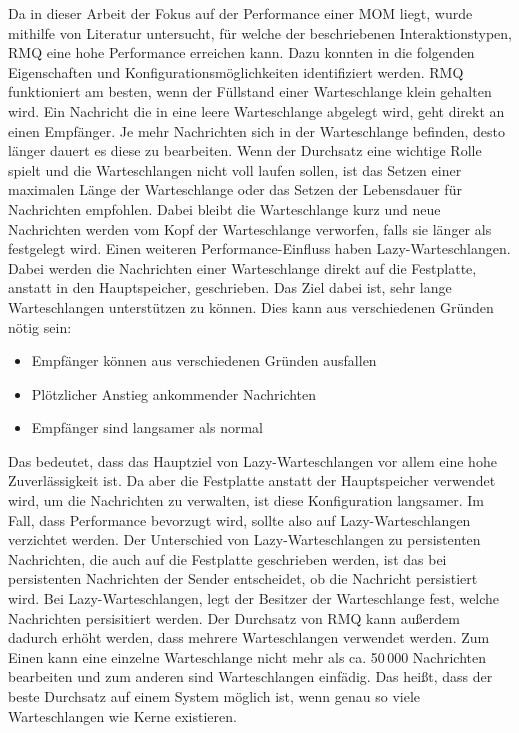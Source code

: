 Da in dieser Arbeit der Fokus auf der Performance einer MOM liegt, wurde mithilfe von Literatur untersucht, für welche der beschriebenen Interaktionstypen, RMQ eine hohe Performance erreichen kann. Dazu konnten in \cite{rabbitmq} die folgenden Eigenschaften und Konfigurationsmöglichkeiten identifiziert werden. RMQ funktioniert am besten, wenn der Füllstand einer Warteschlange klein gehalten wird. Ein Nachricht die in eine leere Warteschlange abgelegt wird, geht direkt an einen Empfänger. Je mehr Nachrichten sich in der Warteschlange befinden, desto länger dauert es diese zu bearbeiten. Wenn der Durchsatz eine wichtige Rolle spielt und die Warteschlangen nicht voll laufen sollen, ist das Setzen einer maximalen Länge der Warteschlange oder das Setzen der Lebensdauer für Nachrichten empfohlen. Dabei bleibt die Warteschlange kurz und neue Nachrichten werden vom Kopf der Warteschlange verworfen, falls sie länger als festgelegt wird. Einen weiteren Performance-Einfluss haben Lazy-Warteschlangen. Dabei werden die Nachrichten einer Warteschlange direkt auf die Festplatte, anstatt in den Hauptspeicher, geschrieben. Das Ziel dabei ist, sehr lange Warteschlangen unterstützen zu können. Dies kann aus verschiedenen Gründen nötig sein:
\begin{itemize}
    \item Empfänger können aus verschiedenen Gründen ausfallen
    \item Plötzlicher Anstieg ankommender Nachrichten
    \item Empfänger sind langsamer als normal
\end{itemize}
Das bedeutet, dass das Hauptziel von Lazy-Warteschlangen vor allem eine hohe Zuverlässigkeit ist. Da aber die Festplatte anstatt der Hauptspeicher verwendet wird, um die Nachrichten zu verwalten, ist diese Konfiguration langsamer. Im Fall, dass Performance bevorzugt wird, sollte also auf Lazy-Warteschlangen verzichtet werden. Der Unterschied von Lazy-Warteschlangen zu persistenten Nachrichten, die auch auf die Festplatte geschrieben werden, ist das bei persistenten Nachrichten der Sender entscheidet, ob die Nachricht persistiert wird. Bei Lazy-Warteschlangen, legt der Besitzer der Warteschlange fest, welche Nachrichten persisitiert werden. Der Durchsatz von RMQ kann außerdem dadurch erhöht werden, dass mehrere Warteschlangen verwendet werden. Zum Einen kann eine einzelne Warteschlange nicht mehr als ca. 50\,000 Nachrichten bearbeiten und zum anderen sind Warteschlangen einfädig. Das heißt, dass der beste Durchsatz auf einem System möglich ist, wenn genau so viele Warteschlangen wie Kerne existieren. 

